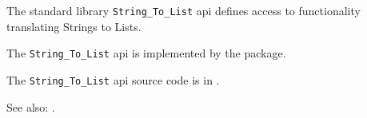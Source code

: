 
The standard library {\tt String\_To\_List} api defines access to functionality translating 
Strings to Lists.

The {\tt String\_To\_List} api is implemented by the  package.

The {\tt String\_To\_List} api source code is in .

See also:  .
